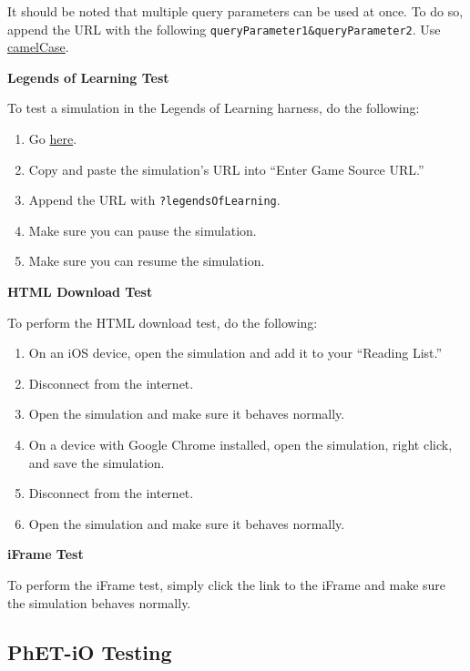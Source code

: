 \documentclass[titlepage]{article}
\begin{document}
It should be noted that multiple query parameters can be used at once. To do so, append the URL with the following \verb|queryParameter1&queryParameter2|. Use \href{https://en.wikipedia.org/wiki/Camel_case}{camelCase}.

\textbf{Legends of Learning Test}

To test a simulation in the Legends of Learning harness, do the following:

		\begin{enumerate}
			\item Go \href{https://developers.legendsoflearning.com/public-harness/index.html}{here}.
			\item Copy and paste the simulation's URL into ``Enter Game Source URL.''
			\item Append the URL with \verb|?legendsOfLearning|.
			\item Make sure you can pause the simulation.
			\item Make sure you can resume the simulation.
		\end{enumerate}

\textbf{HTML Download Test}

To perform the HTML download test, do the following:

		\begin{enumerate}
			\item On an iOS device, open the simulation and add it to your ``Reading List.''
			\item Disconnect from the internet.
			\item Open the simulation and make sure it behaves normally.
			\item On a device with Google Chrome installed, open the simulation, right click, and save the simulation.
			\item Disconnect from the internet.
			\item Open the simulation and make sure it behaves normally.
		\end{enumerate}

\textbf{iFrame Test}

To perform the iFrame test, simply click the link to the iFrame and make sure the simulation behaves normally.

	\subsection{PhET-iO Testing}
\end{document}
